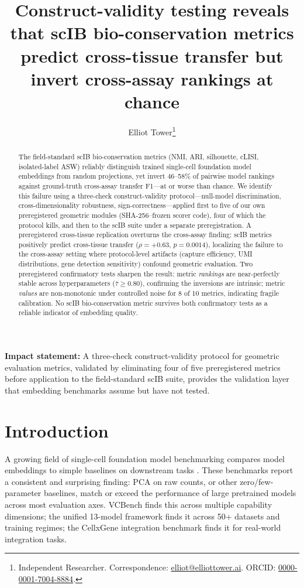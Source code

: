 \documentclass[10pt,letterpaper]{article}
\title{Construct-validity testing reveals that scIB bio-conservation metrics predict cross-tissue transfer but invert cross-assay rankings at chance}
\author{Elliot Tower\thanks{Independent Researcher. Correspondence: \href{mailto:elliot@elliottower.ai}{elliot@elliottower.ai}. ORCID: \href{https://orcid.org/0000-0001-7004-8884}{0000-0001-7004-8884}.}}
\begin{document}
\maketitle

\begin{abstract}
The field-standard scIB bio-conservation metrics (NMI, ARI, silhouette, cLISI, isolated-label ASW) reliably distinguish trained single-cell foundation model embeddings from random projections, yet invert 46--58\% of pairwise model rankings against ground-truth cross-assay transfer F1---at or worse than chance. We identify this failure using a three-check construct-validity protocol---null-model discrimination, cross-dimensionality robustness, sign-correctness---applied first to five of our own preregistered geometric modules (SHA-256--frozen scorer code), four of which the protocol kills, and then to the scIB suite under a separate preregistration. A preregistered cross-tissue replication overturns the cross-assay finding: scIB metrics positively predict cross-tissue transfer ($\rho = +0.63$, $p = 0.0014$), localizing the failure to the cross-assay setting where protocol-level artifacts (capture efficiency, UMI distributions, gene detection sensitivity) confound geometric evaluation. Two preregistered confirmatory tests sharpen the result: metric \emph{rankings} are near-perfectly stable across hyperparameters ($\bar{\tau} \geq 0.80$), confirming the inversions are intrinsic; metric \emph{values} are non-monotonic under controlled noise for 8 of 10 metrics, indicating fragile calibration. No scIB bio-conservation metric survives both confirmatory tests as a reliable indicator of embedding quality.
\end{abstract}

\noindent\textbf{Impact statement:} A three-check construct-validity protocol for geometric evaluation metrics, validated by eliminating four of five preregistered metrics before application to the field-standard scIB suite, provides the validation layer that embedding benchmarks assume but have not tested.


\section{Introduction}

A growing field of single-cell foundation model benchmarking compares model embeddings to simple baselines on downstream tasks \citep{luecken2022scib, wu2025scfm, vcbench2026, unifiedscfm2026, cellxgeneintegration2026}. These benchmarks report a consistent and surprising finding: PCA on raw counts, or other zero/few-parameter baselines, match or exceed the performance of large pretrained models across most evaluation axes. VCBench \citep{vcbench2026} finds this across multiple capability dimensions; the unified 13-model framework \citep{unifiedscfm2026} finds it across 50+ datasets and training regimes; the CellxGene integration benchmark \citep{cellxgeneintegration2026} finds it for real-world integration tasks.
\end{document}
